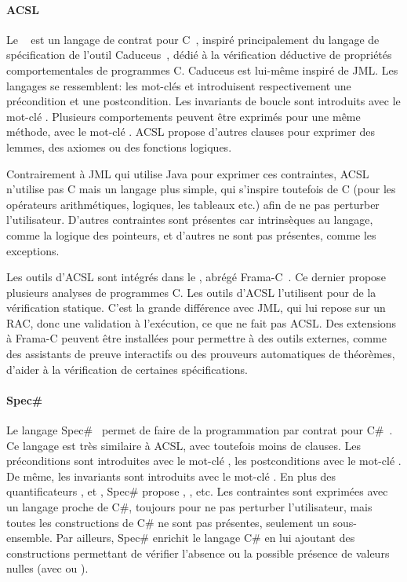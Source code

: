 \paragraph{ACSL} Le ~
est un langage de contrat pour C~, inspiré principalement du langage de
spécification de l'outil Caduceus~, dédié à la vérification
déductive de propriétés comportementales de programmes C. Caduceus est lui-même
inspiré de JML. Les langages se ressemblent: les mot-clés  et
 introduisent respectivement une précondition et une
postcondition. Les invariants de boucle sont introduits avec le mot-clé
. Plusieurs comportements peuvent être exprimés pour une même
méthode, avec le mot-clé . ACSL propose d'autres clauses pour
exprimer des lemmes, des axiomes ou des fonctions logiques.

Contrairement à JML qui utilise Java pour exprimer ces contraintes, ACSL
n'utilise pas C mais un langage plus simple, qui s'inspire toutefois de C (pour
les opérateurs arithmétiques, logiques, les tableaux etc.) afin de ne pas
perturber l'utilisateur. D'autres contraintes sont présentes car intrinsèques au
langage, comme la logique des pointeurs, et d'autres ne sont pas présentes,
comme les exceptions.

Les outils d'ACSL sont intégrés dans le , abrégé Frama-C~. Ce dernier propose
plusieurs analyses de programmes C. Les outils d'ACSL l'utilisent pour de la
vérification statique. C'est la grande différence avec JML, qui lui repose sur
un RAC, donc une validation à l'exécution, ce que ne fait pas ACSL. Des
extensions à Frama-C peuvent être installées pour permettre à des outils
externes, comme des assistants de preuve interactifs ou des prouveurs
automatiques de théorèmes, d'aider à la vérification de certaines
spécifications.

\paragraph{Spec\#} Le langage Spec\#~ permet de faire de la
programmation par contrat pour C\#~. Ce langage est très similaire
à ACSL, avec toutefois moins de clauses. Les préconditions sont introduites avec
le mot-clé , les postconditions avec le mot-clé .
De même, les invariants sont introduits avec le mot-clé . En
plus des quantificateurs ,  et ,
Spec\# propose , ,  etc. Les contraintes sont
exprimées avec un langage proche de C\#, toujours pour ne pas perturber
l'utilisateur, mais toutes les constructions de C\# ne sont pas présentes,
seulement un sous-ensemble.  Par ailleurs, Spec\# enrichit le langage C\# en lui
ajoutant des constructions permettant de vérifier l'absence ou la possible
présence de valeurs nulles (avec \code{!} ou ).

